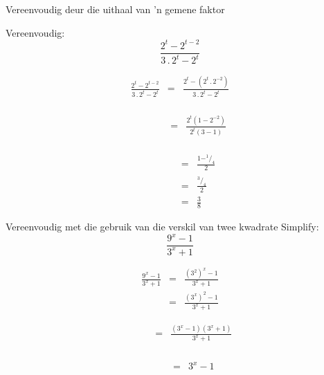 
\begin{wex}
{%
Vereenvoudig deur die uithaal van 'n gemene faktor
}
{%
Vereenvoudig: $$\frac{2^t-2^{t-2}}{3\,.\,2^t-2^t} $$

}
{%
\begin{eqnarray*}
\frac{2^t-2^{t-2}}{3\,.\,2^t-2^t} & = & \frac{2^t-(2^t\,.\,2^{-2})}{3\,.\,2^t-2^t} \\
\end{eqnarray*}


\begin{eqnarray*}
\phantom{\frac{2^t-2^{t-2}}{3\,.\,2^t-2^t}}  & = & \frac{2^t(1-2^{-2})}{2^t(3-1)} \\
\end{eqnarray*}



\begin{eqnarray*}
\phantom{\frac{2^t-2^{t-2}}{3\,.\,2^t-2^t}}  & = & \frac{1-^1/_4}{2} \\
					     & = & \frac{^3/_4}{2} \\
					     & = & \frac{3}{8}
\end{eqnarray*}


} 
\end{wex}




\begin{wex}
{
Vereenvoudig met die gebruik van die verskil van twee kwadrate
}
{
Simplify: 
$$ \frac{9^x-1}{3^x+1} $$
}
{
\begin{eqnarray*}
 \frac{9^x-1}{3^x+1} & = & \frac{(3^2)^x -1}{3^x+1} \\
		     & = & \frac{(3^x)^2-1}{3^x+1} 
\end{eqnarray*}


\begin{eqnarray*}
 \phantom{\frac{9^x-1}{3^x+1}} & = & \frac{(3^x-1)(3^x+1)}{3^x+1}\\
\end{eqnarray*}


\begin{eqnarray*}
 \phantom{\frac{9^x-1}{3^x+1}} & = & 3^x-1\\
\end{eqnarray*}

}
\end{wex}


